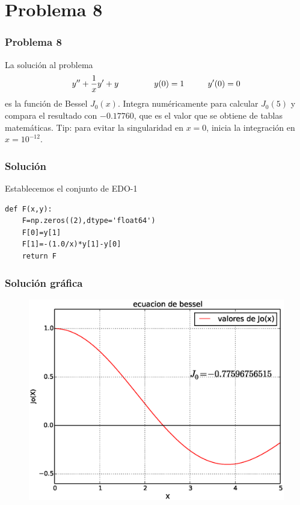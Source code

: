 \section{Problema 8}
\begin{frame}
\frametitle{Problema 8}
La solución al problema
\[ y'' + \dfrac{1}{x} y' + y \hspace{1.5cm} y(0)=1 \hspace{1cm} y'(0)=0\]
es la función de Bessel $J_{0}(x)$. Integra numéricamente para calcular $J_{0}(5)$ y compara el resultado con $-0.17760$, que es el valor que se obtiene de tablas matemáticas. Tip: para evitar la singularidad en $x=0$, inicia la integración en $x=10^{-12}$.
\end{frame}
\begin{frame}[fragile]
\frametitle{Solución}
Establecemos el conjunto de EDO-1
\begin{lstlisting}
def F(x,y):
    F=np.zeros((2),dtype='float64')
    F[0]=y[1]
    F[1]=-(1.0/x)*y[1]-y[0]
    return F
\end{lstlisting}
\end{frame}
\begin{frame}
\frametitle{Solución gráfica}
\begin{figure}
	\centering
	\includegraphics[scale=0.5]{Examen3_P8_01.eps}
\end{figure}
\end{frame}

